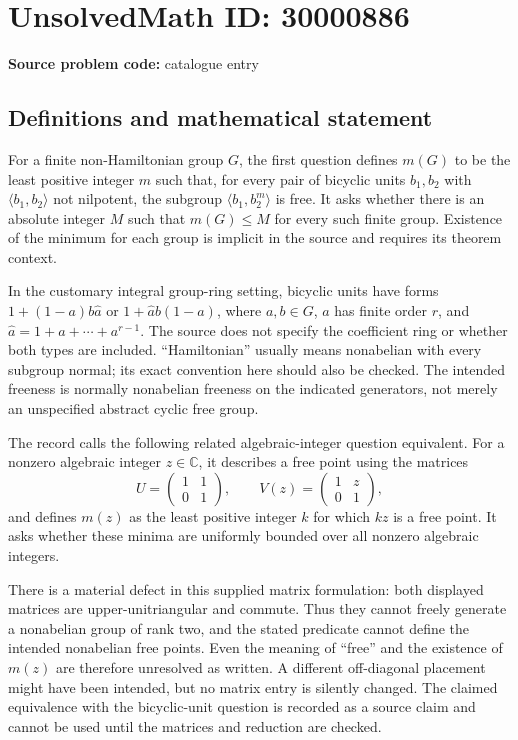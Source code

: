 \documentclass[11pt]{article}
\newcommand{\C}{\mathbb{C}}
\begin{document}
\section*{UnsolvedMath ID: 30000886}
\textbf{Source problem code:} catalogue entry
\subsection{Definitions and mathematical statement}
For a finite non-Hamiltonian group \(G\), the first question defines \(m(G)\) to be the least positive integer \(m\) such that, for every pair of bicyclic units \(b_1,b_2\) with \(\langle b_1,b_2\rangle\) not nilpotent, the subgroup \(\langle b_1,b_2^m\rangle\) is free. It asks whether there is an absolute integer \(M\) such that \(m(G)\leq M\) for every such finite group. Existence of the minimum for each group is implicit in the source and requires its theorem context.

In the customary integral group-ring setting, bicyclic units have forms \(1+(1-a)b\widehat a\) or \(1+\widehat a b(1-a)\), where \(a,b\in G\), \(a\) has finite order \(r\), and \(\widehat a=1+a+\cdots+a^{r-1}\). The source does not specify the coefficient ring or whether both types are included. ``Hamiltonian'' usually means nonabelian with every subgroup normal; its exact convention here should also be checked. The intended freeness is normally nonabelian freeness on the indicated generators, not merely an unspecified abstract cyclic free group.

The record calls the following related algebraic-integer question equivalent. For a nonzero algebraic integer \(z\in\C\), it describes a free point using the matrices
\[
U=\begin{pmatrix}1&1\\0&1\end{pmatrix},\qquad
V(z)=\begin{pmatrix}1&z\\0&1\end{pmatrix},
\]
and defines \(m(z)\) as the least positive integer \(k\) for which \(kz\) is a free point. It asks whether these minima are uniformly bounded over all nonzero algebraic integers.

There is a material defect in this supplied matrix formulation: both displayed matrices are upper-unitriangular and commute. Thus they cannot freely generate a nonabelian group of rank two, and the stated predicate cannot define the intended nonabelian free points. Even the meaning of ``free'' and the existence of \(m(z)\) are therefore unresolved as written. A different off-diagonal placement might have been intended, but no matrix entry is silently changed. The claimed equivalence with the bicyclic-unit question is recorded as a source claim and cannot be used until the matrices and reduction are checked.
\end{document}
